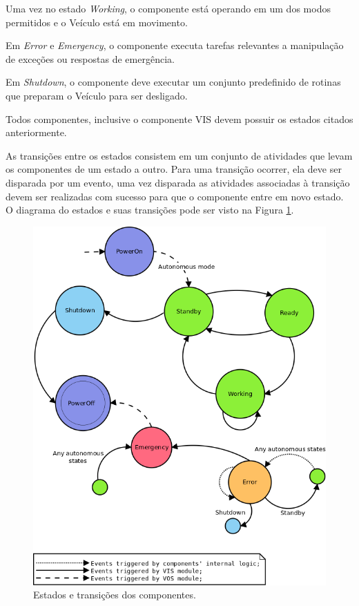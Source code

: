 \documentclass[conference]{IEEEtran}
\begin{document}
Uma vez no estado \textit{Working}, o componente está operando em um dos modos permitidos e o Veículo está em movimento.

Em \textit{Error} e \textit{Emergency}, o componente executa tarefas relevantes a manipulação de exceções ou respostas de emergência.

Em \textit{Shutdown}, o componente deve executar um conjunto predefinido de rotinas que preparam o Veículo para ser desligado.

Todos componentes, inclusive o componente VIS devem possuir os estados citados anteriormente.

As transições entre os estados consistem em um conjunto de atividades que levam os componentes de um estado a outro. Para uma transição ocorrer, ela deve ser disparada por um evento, uma vez disparada as atividades associadas à transição devem ser realizadas com sucesso para que o componente entre em novo estado. O diagrama do estados e suas transições pode ser visto na Figura \ref{fig:estados_transicoes}.

\begin{figure}[!ht]
	\centering
	\includegraphics[scale=0.32]{files/VILMA_STATE_MACHINE2.png}
	\caption{Estados e transições dos componentes.}
	\label{fig:estados_transicoes}
\end{figure}
\end{document}
